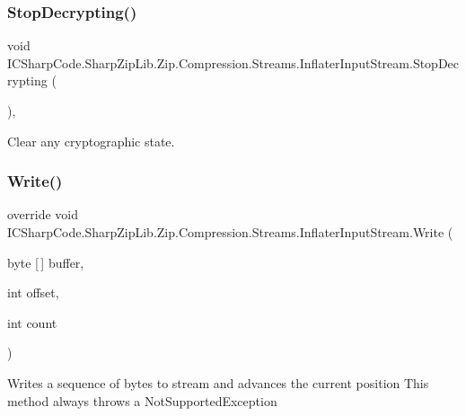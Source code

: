 \subsubsection{\texorpdfstring{Stop\+Decrypting()}{StopDecrypting()}\hspace{0.1cm}{\footnotesize\ttfamily [2/2]}}
{\footnotesize\ttfamily void I\+C\+Sharp\+Code.\+Sharp\+Zip\+Lib.\+Zip.\+Compression.\+Streams.\+Inflater\+Input\+Stream.\+Stop\+Decrypting (\begin{DoxyParamCaption}{ }\end{DoxyParamCaption})\hspace{0.3cm}{\ttfamily [inline]}, {\ttfamily [protected]}}



Clear any cryptographic state. 

\mbox{\label{class_i_c_sharp_code_1_1_sharp_zip_lib_1_1_zip_1_1_compression_1_1_streams_1_1_inflater_input_stream_aba845c76ab368c90a6e95de12e4d4d45}} 
\subsubsection{\texorpdfstring{Write()}{Write()}\hspace{0.1cm}{\footnotesize\ttfamily [1/2]}}
{\footnotesize\ttfamily override void I\+C\+Sharp\+Code.\+Sharp\+Zip\+Lib.\+Zip.\+Compression.\+Streams.\+Inflater\+Input\+Stream.\+Write (\begin{DoxyParamCaption}\item[{byte \mbox{[}$\,$\mbox{]}}]{buffer,  }\item[{int}]{offset,  }\item[{int}]{count }\end{DoxyParamCaption})\hspace{0.3cm}{\ttfamily [inline]}}



Writes a sequence of bytes to stream and advances the current position This method always throws a Not\+Supported\+Exception 


